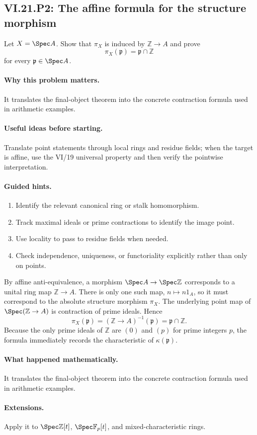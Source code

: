 \subsection*{VI.21.P2: The affine formula for the structure morphism}
\begin{problem}\label{prob:vi21-p02}
Let $X=\Spec A$.  Show that $\pi_X$ is induced by $\mathbb Z\to A$ and prove
\[
\pi_X(\mathfrak p)=\mathfrak p\cap\mathbb Z
\]
for every $\mathfrak p\in\Spec A$.
\end{problem}

\ifdefined\FullProblemDossiers
\paragraph{Why this problem matters.}
It translates the final-object theorem into the concrete contraction formula used in arithmetic examples.

\paragraph{Useful ideas before starting.}
Translate point statements through local rings and residue fields; when the target is affine, use the VI/19 universal property and then verify the pointwise interpretation.

\paragraph{Guided hints.}
\begin{enumerate}
\item Identify the relevant canonical ring or stalk homomorphism.
\item Track maximal ideals or prime contractions to identify the image point.
\item Use locality to pass to residue fields when needed.
\item Check independence, uniqueness, or functoriality explicitly rather than only on points.
\end{enumerate}

\begin{solution}
By affine anti-equivalence, a morphism $\Spec A\to\Spec\mathbb Z$ corresponds to a unital ring map
$\mathbb Z\to A$.  There is only one such map, $n\mapsto n1_A$, so it must correspond to the
absolute structure morphism $\pi_X$.  The underlying point map of $\Spec(\mathbb Z\to A)$ is
contraction of prime ideals.  Hence
\[
\pi_X(\mathfrak p)=(\mathbb Z\to A)^{-1}(\mathfrak p)=\mathfrak p\cap\mathbb Z.
\]
Because the only prime ideals of $\mathbb Z$ are $(0)$ and $(p)$ for prime integers $p$, the
formula immediately records the characteristic of $\kappa(\mathfrak p)$.
\end{solution}

\paragraph{What happened mathematically.}
It translates the final-object theorem into the concrete contraction formula used in arithmetic examples.

\paragraph{Extensions.}
Apply it to $\Spec\mathbb Z[t]$, $\Spec\mathbb F_p[t]$, and mixed-characteristic rings.
\fi
